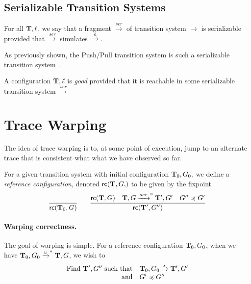 \subsection{Serializable Transition Systems}


\begin{definition}
For all $\mathbf{T},\ell$, we say that a fragment 
$\xrightarrow{ser}$ of transition system $\xrightarrow{}$ is
serializable provided that 
$\xrightarrow{ser}$ simulates $\xrightarrow{a}$.
\end{definition}


As previously shown, the Push/Pull transition system is such a
serializable transition system~\cite{PMPY}.

\begin{definition}
A configuration $\mathbf{T},\ell$ is \emph{good} provided that it is reachable in
some serializable transition system $\xrightarrow{ser}$
\end{definition}






\section{Trace Warping}

The idea of trace warping is to, at some point of execution, jump to
an alternate trace that is consistent what what we have observed so
far. 

\newcommand\rc[2]{\textsf{rc}(#1,#2)}
\begin{definition}
For a given transition system with initial configuration $\mathbf{T}_0,G_0$,
we define a \emph{reference configuration}, denoted
$\rc{\Ts,G}$ to be given by the fixpoint
$$
\infer{\rc{\Ts_0}{G}}{}
\qquad
\infer{\rc{\Ts'}{G''}}{
   \rc{\Ts}{G}
&  \Ts,G \xrightarrow{ser}^{*} \Ts',G'
&  G'' \opeq G'
}
$$
\end{definition}

\paragraph{Warping correctness.} The goal of warping is simple. For a reference
configuration $\mathbf{T}_0,G_0$, when we have 
$\mathbf{T}_0,G_0 \xrightarrow{u}^{*} \mathbf{T},G$, we wish to
\[ \begin{array}{rl}
   \text{Find } \mathbf{T}',G'' \text{ such that}&
      \mathbf{T}_0,G_0 \xrightarrow{s} \mathbf{T}',G'\\
  \text{and}&G' \preccurlyeq G''
\end{array} \]

